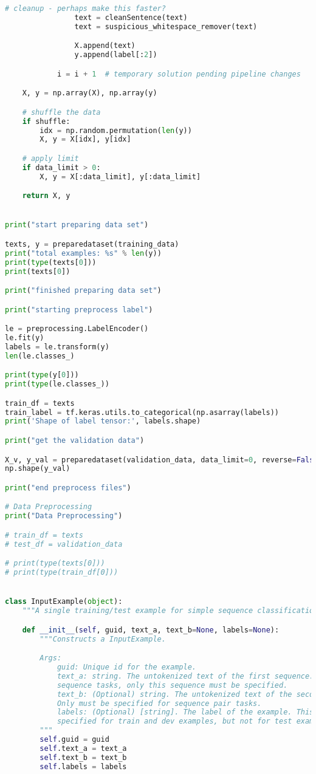 \begin{lstlisting}[language=Python, caption=My attempt to adapt BERT to short text classification]
                # cleanup - perhaps make this faster?
                text = cleanSentence(text)
                text = suspicious_whitespace_remover(text)

                X.append(text)
                y.append(label[:2])

            i = i + 1  # temporary solution pending pipeline changes

    X, y = np.array(X), np.array(y)

    # shuffle the data
    if shuffle:
        idx = np.random.permutation(len(y))
        X, y = X[idx], y[idx]

    # apply limit
    if data_limit > 0:
        X, y = X[:data_limit], y[:data_limit]

    return X, y


print("start preparing data set")

texts, y = preparedataset(training_data)
print("total examples: %s" % len(y))
print(type(texts[0]))
print(texts[0])

print("finished preparing data set")

print("starting preprocess label")

le = preprocessing.LabelEncoder()
le.fit(y)
labels = le.transform(y)
len(le.classes_)

print(type(y[0]))
print(type(le.classes_))

train_df = texts
train_label = tf.keras.utils.to_categorical(np.asarray(labels))
print('Shape of label tensor:', labels.shape)

print("get the validation data")

X_v, y_val = preparedataset(validation_data, data_limit=0, reverse=False)
np.shape(y_val)

print("end preprocess files")

# Data Preprocessing
print("Data Preprocessing")

# train_df = texts
# test_df = validation_data

# print(type(texts[0]))
# print(type(train_df[0]))


class InputExample(object):
    """A single training/test example for simple sequence classification."""

    def __init__(self, guid, text_a, text_b=None, labels=None):
        """Constructs a InputExample.

        Args:
            guid: Unique id for the example.
            text_a: string. The untokenized text of the first sequence. For single
            sequence tasks, only this sequence must be specified.
            text_b: (Optional) string. The untokenized text of the second sequence.
            Only must be specified for sequence pair tasks.
            labels: (Optional) [string]. The label of the example. This should be
            specified for train and dev examples, but not for test examples.
        """
        self.guid = guid
        self.text_a = text_a
        self.text_b = text_b
        self.labels = labels



\end{lstlisting}
